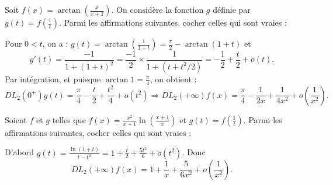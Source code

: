 \begin{question}
Soit $\displaystyle f(x)=\arctan\left(\frac{x}{x+1}\right)$. On considère la fonction $g$ définie par $\displaystyle g(t)=f\left(\frac{1}{t}\right)$. Parmi les affirmations suivantes, cocher celles qui sont vraies :
\begin{answers}  
\end{answers}
\begin{explanations}
Pour $0<t$, on a : $\displaystyle g(t)=\arctan\left(\frac{1}{1+t}\right)=\frac{\pi}{2}-\arctan (1+t)$ et
$$g'(t)=\frac{-1}{1+(1+t)^2}=\frac{-1}{2}\times \frac{1}{1+(t+t^2/2)}=-\frac{1}{2}+\frac{t}{2}+o(t).$$
Par intégration, et puisque $\displaystyle \arctan 1=\frac{\pi}{4}$, on obtient :
$$DL_2(0^+)g(t)=\frac{\pi}{4}-\frac{t}{2}+\frac{t^2}{4}+o(t^2)\Rightarrow DL_2(+\infty)f(x)=\frac{\pi}{4}-\frac{1}{2x}+\frac{1}{4x^2}+o\left(\frac{1}{x^2}\right).$$
\end{explanations}
\end{question}

\begin{question}
Soient $f$ et $g$ telles que $\displaystyle f(x)=\frac{x^2}{x-1}\ln\left(\frac{x+1}{x}\right)$ et $\displaystyle g(t)=f\left(\frac{1}{t}\right)$. Parmi les affirmations suivantes, cocher celles qui sont vraies :
\begin{answers}  
\end{answers}
\begin{explanations}
D'abord $\displaystyle g(t)=\frac{\ln (1+t)}{t-t^2}=1+\frac{t}{2}+\frac{5t^2}{6}+o(t^2)$. Donc
$$DL_2(+\infty)f(x)=1+\frac{1}{x}+\frac{5}{6x^2}+o\left(\frac{1}{x^2}\right).$$
\end{explanations}
\end{question}

